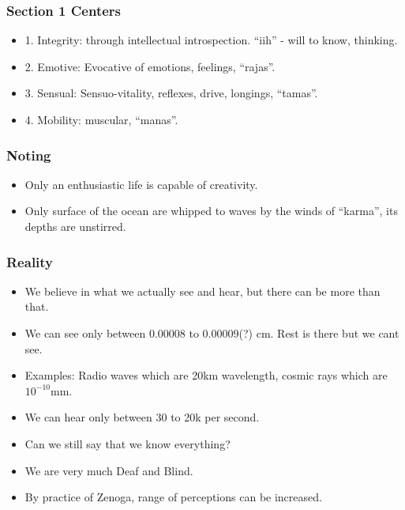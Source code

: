 \begin{frame}[fragile]
\frametitle{Section 1 Centers}

\begin{itemize}
\item 1. Integrity: through intellectual introspection. ``iih'' - will to know, thinking.
\item 2. Emotive: Evocative of emotions, feelings, ``rajas''.
\item 3. Sensual: Sensuo-vitality, reflexes, drive, longings, ``tamas''.
\item 4. Mobility: muscular, ``manas''.
\end{itemize}


\end{frame}

\begin{frame}[fragile]
\frametitle{Noting}

\begin{itemize}
\item Only an enthusiastic life is capable of creativity.
\item Only surface of the ocean are whipped to waves by the winds of ``karma'', its depths are unstirred.
\end{itemize}


\end{frame}

\begin{frame}[fragile]
\frametitle{Reality}

\begin{itemize}
\item We believe in what we actually see and hear, but there can be more than that.
\item We can see only between 0.00008 to 0.00009(?) cm. Rest is there but we cant see.
\item Examples: Radio waves which are 20km wavelength, cosmic rays which are $10^{-10}$mm.
\item We can hear only between 30 to 20k per second.
\item Can we still say that we know everything?
\item We are very much Deaf and Blind.
\item By practice of Zenoga, range of perceptions can be increased.
\end{itemize}


\end{frame}

